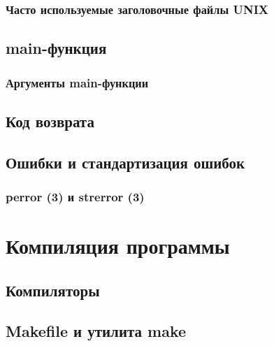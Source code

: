 \documentclass[oneside]{book}
\begin{document}
			\subsection{Часто используемые заголовочные файлы UNIX}
			
	
		\section{main-функция}
		
		
			\subsection{Аргументы main-функции}
			
		
		\section{Код возврата}
		
		
		\section{Ошибки и стандартизация ошибок}
		
		
			\subsection{perror (3) и strerror (3)}
			
		
	\chapter{Компиляция программы}
	
	
		\section{Компиляторы}
		
	
		\section{Makefile и утилита make}
		
	
\end{document}
